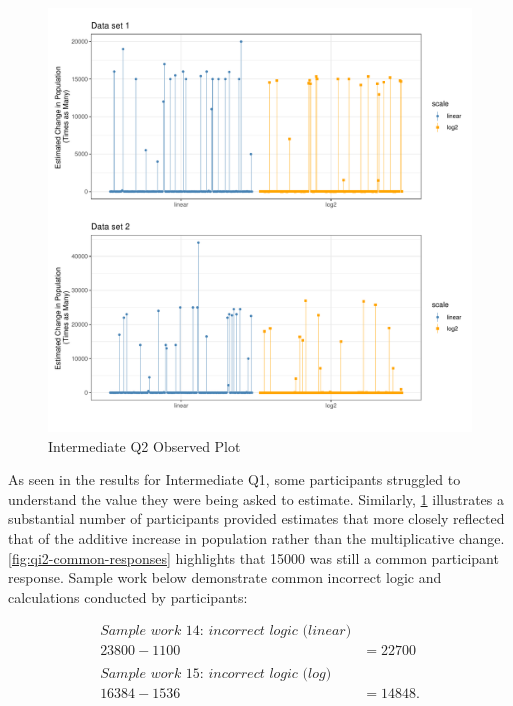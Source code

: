 \documentclass[print]{nuthesis}
\begin{document}
\begin{figure}[tbp]

{\centering \includegraphics[width=1\linewidth,]{thesis_files/figure-latex/qi2-plots-1} 

}

\caption{Intermediate Q2 Observed Plot}\label{fig:qi2-plots}
\end{figure}

As seen in the results for Intermediate Q1, some participants struggled to understand the value they were being asked to estimate.
Similarly, \cref{fig:qi2-plots} illustrates a substantial number of participants provided estimates that more closely reflected that of the additive increase in population rather than the multiplicative change.
\cref{fig:qi2-common-responses} highlights that 15000 was still a common participant response.
Sample work below demonstrate common incorrect logic and calculations conducted by participants:

\begin{align}
\textit{Sample work 14: incorrect logic (linear)} \nonumber\\
23800-1100&=22700 \nonumber\\   
\nonumber \\
\textit{Sample work 15: incorrect logic (log)} \nonumber\\
16384-1536&=14848. \nonumber
\end{align}
\end{document}
